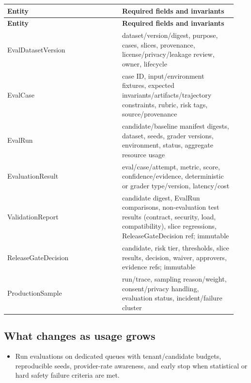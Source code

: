 \BookTableStart
\small
\begin{longtable}{@{}Y{0.4700\linewidth}Y{0.4700\linewidth}@{}}
\color{white}\bfseries \textbf{Entity} & \color{white}\bfseries \textbf{Required fields and invariants} \\
\endfirsthead
{}
\color{white}\bfseries \textbf{Entity} & \color{white}\bfseries \textbf{Required fields and invariants} \\
\endhead
EvalDatasetVersion & dataset/version/digest, purpose, cases, slices, provenance, license/privacy/leakage review, owner, lifecycle \\
EvalCase & case ID, input/environment fixtures, expected invariants/artifacts/trajectory constraints, rubric, risk tags, source/provenance \\
EvalRun & candidate/baseline manifest digests, dataset, seeds, grader versions, environment, status, aggregate resource usage \\
EvaluationResult & eval/case/attempt, metric, score, confidence/evidence, deterministic or grader type/version, latency/cost \\
ValidationReport & candidate digest, EvalRun comparisons, non-evaluation test results (contract, security, load, compatibility), slice regressions, ReleaseGateDecision ref; immutable \\
ReleaseGateDecision & candidate, risk tier, thresholds, slice results, decision, waiver, approvers, evidence refs; immutable \\
ProductionSample & run/trace, sampling reason/weight, consent/privacy handling, evaluation status, incident/failure cluster \\
\end{longtable}
\BookTableEnd

\subsection{What changes as usage grows}

\begin{itemize}

\item Run evaluations on dedicated queues with tenant/candidate budgets, reproducible seeds, provider-rate awareness, and early stop when statistical or hard safety failure criteria are met.

\end{itemize}

